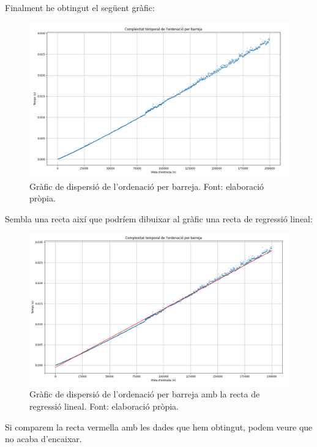 Finalment he obtingut el següent gràfic:
\begin{figure}[H]
    \centering
    \includegraphics[width=1\textwidth]{capitols/figures/mergescatter.png}
    \caption[Gràfic de dispersió de l'ordenació per barreja.]{Gràfic de dispersió de l'ordenació per barreja. Font: elaboració pròpia.}
    \label{fig:my_label}
\end{figure}
\vspace{-18pt}
Sembla una recta així que podríem dibuixar al gràfic una recta de regressió lineal:
\begin{figure}[H]
    \centering
    \includegraphics[width=1\textwidth]{capitols/figures/mergescaterline.png}
    \caption[Gràfic de dispersió de l'ordenació per barreja amb la recta de regressió lineal.]{Gràfic de dispersió de l'ordenació per barreja amb la recta de regressió lineal. Font: elaboració pròpia.}
    \label{fig:my_label}
\end{figure}

Si comparem la recta vermella amb les dades que hem obtingut, podem veure que no acaba d'encaixar.

